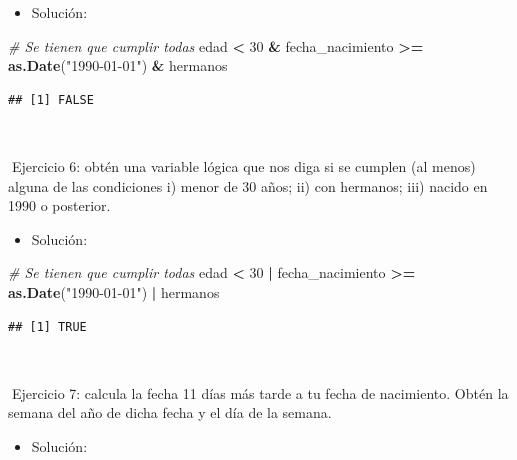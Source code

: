 \documentclass[11pt,]{book}
\newenvironment{Shaded}{\begin{snugshade}}{\end{snugshade}}
\newcommand{\CommentTok}[1]{\textcolor[rgb]{0.37,0.37,0.37}{\textit{#1}}}
\newcommand{\DecValTok}[1]{\textcolor[rgb]{0.06,0.06,0.06}{#1}}
\newcommand{\KeywordTok}[1]{\textcolor[rgb]{0.27,0.27,0.27}{\textbf{#1}}}
\newcommand{\NormalTok}[1]{#1}
\newcommand{\OperatorTok}[1]{\textcolor[rgb]{0.43,0.43,0.43}{\textbf{#1}}}
\newcommand{\StringTok}[1]{\textcolor[rgb]{0.5,0.5,0.5}{#1}}
\providecommand{\tightlist}{%
  \setlength{\itemsep}{0pt}\setlength{\parskip}{0pt}}
\begin{document}
\begin{itemize}
\tightlist
\item
  Solución:
\end{itemize}

\begin{Shaded}
\begin{Highlighting}[]
\CommentTok{# Se tienen que cumplir todas}
\NormalTok{edad }\OperatorTok{<}\StringTok{ }\DecValTok{30} \OperatorTok{&}\StringTok{ }\NormalTok{fecha_nacimiento }\OperatorTok{>=}\StringTok{ }\KeywordTok{as.Date}\NormalTok{(}\StringTok{"1990-01-01"}\NormalTok{) }\OperatorTok{&}\StringTok{ }\NormalTok{hermanos}
\end{Highlighting}
\end{Shaded}

\begin{verbatim}
## [1] FALSE
\end{verbatim}

~

📝Ejercicio 6: obtén una variable lógica que nos diga si se cumplen (al menos) alguna de las condiciones i) menor de 30 años; ii) con hermanos; iii) nacido en 1990 o posterior.

\begin{itemize}
\tightlist
\item
  Solución:
\end{itemize}

\begin{Shaded}
\begin{Highlighting}[]
\CommentTok{# Se tienen que cumplir todas}
\NormalTok{edad }\OperatorTok{<}\StringTok{ }\DecValTok{30} \OperatorTok{|}\StringTok{ }\NormalTok{fecha_nacimiento }\OperatorTok{>=}\StringTok{ }\KeywordTok{as.Date}\NormalTok{(}\StringTok{"1990-01-01"}\NormalTok{) }\OperatorTok{|}\StringTok{ }\NormalTok{hermanos}
\end{Highlighting}
\end{Shaded}

\begin{verbatim}
## [1] TRUE
\end{verbatim}

~

📝Ejercicio 7: calcula la fecha 11 días más tarde a tu fecha de nacimiento. Obtén la semana del año de dicha fecha y el día de la semana.

\begin{itemize}
\tightlist
\item
  Solución:
\end{itemize}
\end{document}
